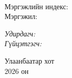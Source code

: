 \begin{titlepage}
\begin{center}

{\scshape\LARGE \univname\par} %
{\scshape\Large \facname\par}\vspace{0.5cm} %

\vspace{2cm}
\hfill \large{\deptname} \\

\vspace{2cm}

{\huge \bfseries \ttitle\par}\vspace{1.5cm} %

\begin{flushleft}
\normalsize
Мэргэжлийн индекс: \degreeid \\
Мэргэжил: \degreename \\
\end{flushleft}

\vspace{2cm}

\begin{flushleft}
\normalsize
\emph{Удирдагч:} {\supname} \\%
\emph{Гүйцэтгэгч:} {\shortname} \\ %
\end{flushleft}

\vfill

\large {Улаанбаатар хот} \\
{\large 2026 он}\\ %

\end{center}
\end{titlepage}
